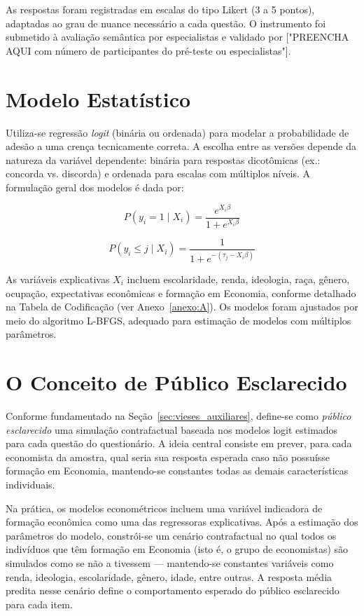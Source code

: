As respostas foram registradas em escalas do tipo Likert (3 a 5 pontos), adaptadas ao grau de nuance necessário a cada questão. O instrumento foi submetido à avaliação semântica por especialistas e validado por ["PREENCHA AQUI com número de participantes do pré-teste ou especialistas"].

\section{Modelo Estatístico}

Utiliza-se regressão \textit{logit} (binária ou ordenada) para modelar a probabilidade de adesão a uma crença tecnicamente correta. A escolha entre as versões depende da natureza da variável dependente: binária para respostas dicotômicas (ex.: concorda vs. discorda) e ordenada para escalas com múltiplos níveis. A formulação geral dos modelos é dada por:

\begin{equation}
P(y_i = 1 \mid X_i) = \frac{e^{X_i \beta}}{1 + e^{X_i \beta}}
\end{equation}

\begin{equation}
P(y_i \leq j \mid X_i) = \frac{1}{1 + e^{-(\tau_j - X_i \beta)}}
\end{equation}

As variáveis explicativas \(X_i\) incluem escolaridade, renda, ideologia, raça, gênero, ocupação, expectativas econômicas e formação em Economia, conforme detalhado na Tabela de Codificação (ver Anexo~\ref{anexo:A}). Os modelos foram ajustados por meio do algoritmo L-BFGS, adequado para estimação de modelos com múltiplos parâmetros.

\section{O Conceito de Público Esclarecido}

Conforme fundamentado na Seção~\ref{sec:vieses_auxiliares}, define-se como \textit{público esclarecido} uma simulação contrafactual baseada nos modelos logit estimados para cada questão do questionário. A ideia central consiste em prever, para cada economista da amostra, qual seria sua resposta esperada caso não possuísse formação em Economia, mantendo-se constantes todas as demais características individuais.

Na prática, os modelos econométricos incluem uma variável indicadora de formação econômica como uma das regressoras explicativas. Após a estimação dos parâmetros do modelo, constrói-se um cenário contrafactual no qual todos os indivíduos que têm formação em Economia (isto é, o grupo de economistas) são simulados como se não a tivessem — mantendo-se constantes variáveis como renda, ideologia, escolaridade, gênero, idade, entre outras. A resposta média predita nesse cenário define o comportamento esperado do público esclarecido para cada item.

